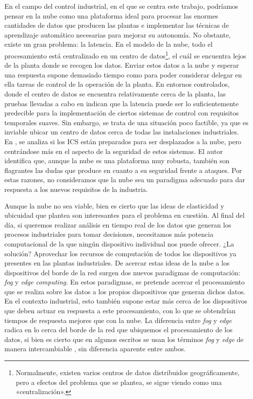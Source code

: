 En el campo del control industrial, en el que se centra este trabajo, podríamos
pensar en la nube como una plataforma ideal para procesar las enormes cantidades
de datos que producen las plantas e implementar las técnicas de aprendizaje
automático necesarias para mejorar su autonomía. No obstante, existe un gran
problema: la latencia. En el modelo de la nube, todo el procesamiento está
centralizado en un centro de datos\footnote{Normalmente, existen varios centros
  de datos distribuidos geográficamente, pero a efectos del problema que se
  plantea, se sigue viendo como una «centralización».}, el cuál se encuentra lejos
de la planta donde se recogen los datos. Enviar estos datos a la nube y esperar
una respuesta supone demasiado tiempo como para poder considerar delegar en ella
tareas de control de la operación de la planta. En entornos controlados, donde
el centro de datos se encuentra relativamente cerca de la planta, las pruebas
llevadas a cabo en \cite{hofer_industrial_2019} indican que la latencia puede
ser lo suficientemente predecible para la implementación de ciertos sistemas de
control con requisitos temporales suaves. Sin embargo, se trata de una situación
poco factible, ya que es inviable ubicar un centro de datos cerca de todas las
instalaciones industriales. En \cite{piggin_are_2015}, se analiza si los
ICS están preparados para ser desplazados a la nube, pero centrándose más en el
aspecto de la seguridad de estos sistemas. El autor identifica que, aunque la
nube es una plataforma muy robusta, también son flagrantes las dudas que produce
en cuanto a su seguridad frente a ataques. Por estas razones, no consideramos
que la nube sea un paradigma adecuado para dar respuesta a los nuevos requisitos
de la industria.

Aunque la nube no sea viable, bien es cierto que las ideas de elasticidad y
ubicuidad que plantea son interesantes para el problema en cuestión. Al final
del día, si queremos realizar análisis en tiempo real de los datos que generan
los procesos industriales para tomar decisiones, necesitamos más potencia
computacional de la que ningún dispositivo individual nos puede ofrecer. ¿La
solución? Aprovechar los recursos de computación de todos los dispositivos ya
presentes en las plantas industriales. De acercar estas ideas de la nube a los
dispositivos del borde de la red surgen dos nuevos paradigmas de computación:
\textit{fog} y \textit{edge computing}. En estos paradigmas, se pretende acercar
el procesamiento que se realiza sobre los datos a los propios dispositivos que
generan dichos datos. En el contexto industrial, esto también supone estar más
cerca de los dispositivos que deben actuar en respuesta a este procesamiento,
con lo que se obtendrían tiempos de respuesta mejores que con la nube. La
diferencia entre \textit{fog} y \textit{edge} radica en lo cerca del borde de la
red que ubiquemos el procesamiento de los datos, si bien es cierto que en
algunos escritos se usan los términos \textit{fog} y \textit{edge} de manera
intercambiable \cite{shi_edge_2019}, sin diferencia aparente entre ambos.

